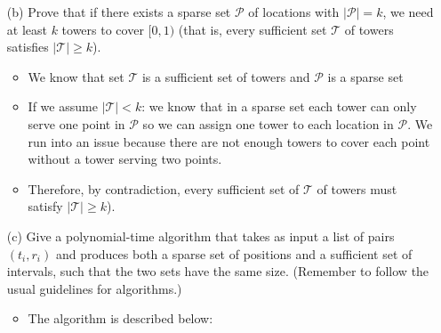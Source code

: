 \documentclass[letterpaper,11pt]{article}
\begin{document}
\begin{enumerate}
\begin{enumerate}
    \item[(b)] Prove that if there exists a sparse set $\mathcal{P}$ of locations with $\lvert\mathcal{P}\rvert = k$, 
    we  need at least $k$ towers to cover $[0,1)$ (that is, every sufficient set $\mathcal{T}$ of towers satisfies $\lvert \mathcal{T}\rvert \geq k$).
    \begin{itemize}
        \color{teal}
        \item We know that set $\mathcal{T}$ is a sufficient set of towers and 
            $\mathcal{P}$ is a sparse set
        \item If we assume $\lvert \mathcal{T}\rvert < k$: we know that in a 
            sparse set each tower can only serve one point in $\mathcal{P}$ 
            so we can assign one tower to each location in $\mathcal{P}$. We 
            run into an issue because there are not enough towers to cover
            each point without a tower serving two points.
        \item Therefore, by contradiction, every sufficient set of 
            $\mathcal{T}$ of towers must satisfy 
            $\lvert \mathcal{T}\rvert \geq k$).

            \newpage
    \end{itemize}
    \item[(c)] Give a polynomial-time algorithm that takes as input a list of pairs $(t_i,r_i)$ and produces both a sparse set of positions  and a sufficient set of intervals, such that the two sets have the same size. (Remember to follow the usual guidelines for algorithms.)
        \begin{itemize}
    \color{teal}
            \item The algorithm is described below:



\end{itemize}
\end{enumerate}
\end{enumerate}
\end{document}
